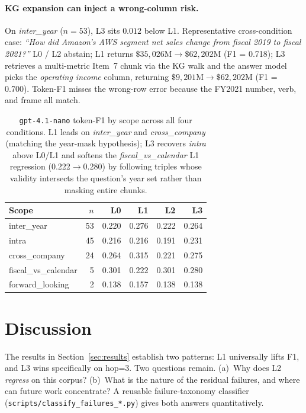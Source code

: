 \documentclass[11pt]{article}
\begin{document}
\paragraph{KG expansion can inject a wrong-column risk.}
On \textit{inter\_year} ($n=53$), L3 sits $0.012$ below L1.
Representative cross-condition case:
\textit{``How did Amazon's AWS segment net sales change from
fiscal 2019 to fiscal 2021?''} L0 / L2 abstain; L1 returns
$\$35{,}026\text{M}\!\to\!\$62{,}202\text{M}$ (F1 = 0.718); L3
retrieves a multi-metric Item~7 chunk via the KG walk and the
answer model picks the \emph{operating income} column, returning
$\$9{,}201\text{M}\!\to\!\$62{,}202\text{M}$ (F1 = 0.700).
Token-F1 misses the wrong-row error because the FY2021 number,
verb, and frame all match.

\begin{table}[h]
\centering
\small
\begin{tabular}{lr rrrr}
\toprule
Scope & $n$ & L0 & L1 & L2 & L3 \\
\midrule
inter\_year          & 53 & 0.220 & 0.276 & 0.222 & 0.264 \\
intra                & 45 & 0.216 & 0.216 & 0.191 & 0.231 \\
cross\_company       & 24 & 0.264 & 0.315 & 0.221 & 0.275 \\
fiscal\_vs\_calendar &  5 & 0.301 & 0.222 & 0.301 & 0.280 \\
forward\_looking     &  2 & 0.138 & 0.157 & 0.138 & 0.138 \\
\bottomrule
\end{tabular}
\caption{\texttt{gpt-4.1-nano} token-F1 by scope across all four
conditions. L1 leads on \textit{inter\_year} and \textit{cross\_company}
(matching the year-mask hypothesis); L3 recovers \textit{intra} above
L0/L1 and softens the \textit{fiscal\_vs\_calendar} L1 regression
(0.222$\to$0.280) by following triples whose validity intersects the
question's year set rather than masking entire chunks.}
\label{tab:by-scope}
\end{table}

\section{Discussion}
\label{sec:discussion}

The results in Section~\ref{sec:results} establish two patterns: L1
universally lifts F1, and L3 wins specifically on hop=3. Two questions
remain. (a)~Why does L2 \emph{regress} on this corpus? (b)~What is the
nature of the residual failures, and where can future work concentrate?
A reusable failure-taxonomy classifier
(\texttt{scripts/classify\_failures\_*.py}) gives both answers
quantitatively.
\end{document}
